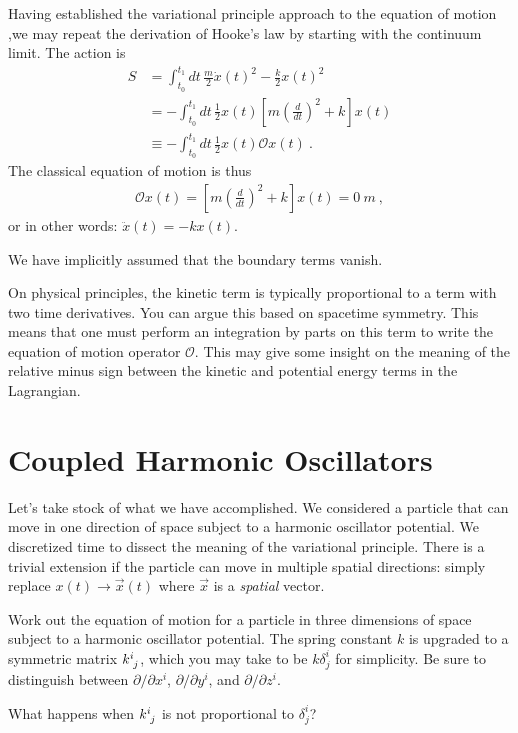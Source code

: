 \begin{example}
Having established the variational principle approach to the equation of motion ,we may repeat the derivation of Hooke's law by starting with the continuum limit. The action is
\begin{align}
    S&= \int_{t_0}^{t_1} dt\, \frac{m}{2}\dot x(t)^2 - \frac{k}{2}x(t)^2
    \\&
    = -\int_{t_0}^{t_1} dt\, \frac{1}{2}x(t)
    \left[m\left(\frac{d}{dt}\right)^2 + k\right]x(t)
    \\&    
    \equiv -\int_{t_0}^{t_1} dt\, \frac{1}{2} x(t) \mathcal O x(t) \ .
\end{align}
The classical equation of motion is thus
\begin{align}
    \mathcal Ox(t) = \left[m\left(\frac{d}{dt}\right)^2 + k\right]x(t) = 0 \ m \ ,
\end{align}
or in other words: $\ddot x(t) = -kx(t)$.
\end{example}
We have implicitly assumed that the boundary terms vanish.

On physical principles, the kinetic term is typically proportional to a term with two time derivatives. You can argue this based on spacetime symmetry. This means that one must perform an integration by parts on this term to write the equation of motion operator $\mathcal O$. This may give some insight on the meaning of the relative minus sign between the kinetic and potential energy terms in the Lagrangian. 




\section{Coupled Harmonic Oscillators}


Let's take stock of what we have accomplished. We considered a particle that can move in one direction of space subject to a harmonic oscillator potential. We discretized time to dissect the meaning of the variational principle. There is a trivial extension if the particle can move in multiple spatial directions: simply replace $x(t) \to \vec{x}(t)$ where $\vec{x}$ is a \emph{spatial} vector. 
\begin{exercise}
Work out the equation of motion for a particle in three dimensions of space subject to a harmonic oscillator potential. The spring constant $k$ is upgraded to a symmetric matrix $k\aij{i}{j}$, which you may take to be $k\delta^i_j$ for simplicity. Be sure to distinguish between $\partial/\partial x^i$, $\partial/\partial y^i$, and $\partial/\partial z^i$.
\end{exercise}
\begin{exercise}
What happens when $k\aij{i}{j}$ is not proportional to $\delta^i_j$?
\end{exercise}

